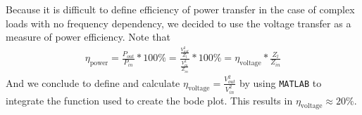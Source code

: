 \documentclass[11pt,titlepage]{report}
\begin{document}
Because it is difficult to define efficiency of power transfer in the case of complex loads with no frequency dependency, we decided to use the voltage transfer as a measure of power efficiency. Note that
\begin{align}
\eta_{\text{power}}=\frac{P_{out}}{P_{in}}*100\% = \frac{\frac{V_{out}^2}{Z_l}}{\frac{V_{in}^2}{Z_{in}}}*100\%=\eta_{\text{voltage}}*\frac{Z_l}{Z_{in}}
\end{align}
And we conclude to define and calculate $\eta_{\text{voltage}}=\frac{V_{out}^2}{V_{in}^2}$ by using \texttt{MATLAB} to integrate the function used to create the bode plot. This results in $\eta_{\text{voltage}}\approx 20\%$.
\end{document}
